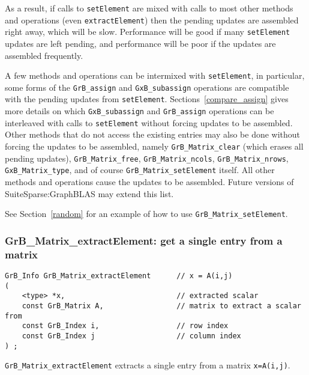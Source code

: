 \documentclass[12pt]{article}
\begin{document}
As a result, if calls to \verb'setElement' are mixed with calls to most other
methods and operations (even \verb'extractElement') then the pending updates
are assembled right away, which will be slow.  Performance will be good if many
\verb'setElement' updates are left pending, and performance will be poor if the
updates are assembled frequently.

A few methods and operations can be intermixed with \verb'setElement', in
particular, some forms of the \verb'GrB_assign' and \verb'GxB_subassign'
operations are compatible with the pending updates from \verb'setElement'.
Sections~\ref{compare_assign} gives more details on which \verb'GxB_subassign'
and \verb'GrB_assign' operations can be interleaved with calls to
\verb'setElement' without forcing updates to be assembled.  Other methods that
do not access the existing entries may also be done without forcing the updates
to be assembled, namely \verb'GrB_Matrix_clear' (which erases all pending
updates), \verb'GrB_Matrix_free', \verb'GrB_Matrix_ncols',
\verb'GrB_Matrix_nrows', \verb'GxB_Matrix_type', and of course
\verb'GrB_Matrix_setElement' itself.  All other methods and operations cause
the updates to be assembled.  Future versions of SuiteSparse:GraphBLAS may
extend this list.

See Section~\ref{random} for an example of how to use
\verb'GrB_Matrix_setElement'.

\subsubsection{{\sf GrB\_Matrix\_extractElement:} get a single entry from a matrix}
\label{matrix_extractElement}

\begin{mdframed}[userdefinedwidth=6in]
{\footnotesize
\begin{verbatim}
GrB_Info GrB_Matrix_extractElement      // x = A(i,j)
(
    <type> *x,                          // extracted scalar
    const GrB_Matrix A,                 // matrix to extract a scalar from
    const GrB_Index i,                  // row index
    const GrB_Index j                   // column index
) ;
\end{verbatim} } \end{mdframed}

\verb'GrB_Matrix_extractElement' extracts a single entry from a matrix
\verb'x=A(i,j)'.
\end{document}
